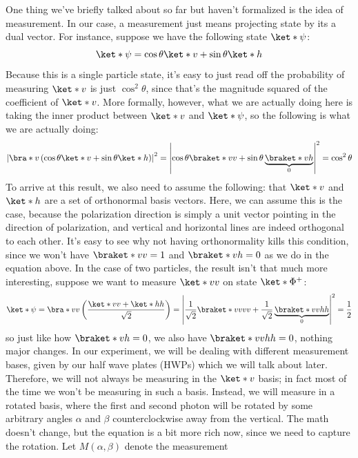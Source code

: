 \documentclass[10pt]{article}
\begin{document}
	One thing we've briefly talked about so far but haven't formalized is the idea of measurement. In our
	case, a measurement just means projecting state by its a dual vector. For instance, suppose we have the
	following state \( \ket*{\psi} \):
	\begin{equation}
		\label{basic-state}
		\ket*{\psi} = \cos \theta \ket*{v} + \sin \theta \ket*{h}
	\end{equation}
	Because this is a single particle state, it's easy to just read off the probability of measuring \(
	\ket*{v} \) is just \( \cos^2 \theta \), since that's the magnitude squared of the coefficient of \(
	\ket*{v} \). More formally, however, what we are actually doing here is taking the inner product between
	\( \ket*{v} \) and \( \ket*{\psi} \), so the following is what we are actually doing:
	\[
		\left| \bra*{v} \left( \cos \theta \ket*{v} + \sin \theta \ket*{h} \right) \right|^2 = \left| \cos
		\theta \braket*{v}{v} + \sin \theta \underbrace{\braket*{v}{h}}_{0}\right|^2 = \cos^2 \theta
	\]
	To arrive at this result, we also need to assume the following: that \( \ket*{v} \) and \( \ket*{h} \)
	are a set of orthonormal basis vectors. Here, we can assume this is the case, because the polarization
	direction is simply a unit vector pointing in the direction of polarization, and vertical and horizontal
	lines are indeed orthogonal to each other. It's easy to see why not having orthonormality kills this
	condition, since we won't have \( \braket*{v}{v} = 1 \) and \( \braket*{v}{h} = 0 \) as we do in the
	equation above. In the case of two particles, the result isn't that much more interesting, suppose we want
	to measure \( \ket*{vv} \) on state \( \ket*{\Phi^{+}} \):
	\[
		\ket*{\psi} = \bra*{vv}\left( \frac{\ket*{vv} + \ket*{hh}}{\sqrt{2}} \right) =
		\left|\frac{1}{\sqrt{2}}\braket*{vv}{vv} + \frac{1}{\sqrt{2}} \underbrace{\braket*{vv}{hh}}_{0}\right|^2 
		= \frac{1}{2}
	\]
	so just like how \( \braket*{v}{h} = 0 \), we also have \( \braket*{vv}{hh} = 0 \), nothing major
	changes. 
	In our experiment, we will be dealing with different measurement bases, given by our half wave plates
	(HWPs) which we will talk about later. Therefore, we will not always be measuring in the \( \ket*{v} \) basis;
	in fact most of the time we won't be measuring in such a basis. Instead, we will measure in a rotated
	basis, where the first and second photon will be rotated by some arbitrary angles \( \alpha \) and \(
	\beta \) counterclockwise away from the vertical. The math doesn't change, but the equation is a bit more
	rich now, since we need to capture the rotation. Let \( M(\alpha, \beta) \) denote the measurement
\end{document}
